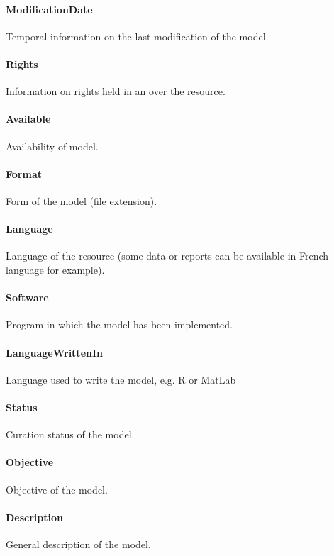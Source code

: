 \documentclass[a4paper]{report}
\begin{document}
\paragraph{ModificationDate}
Temporal information on the last modification of the model.

\paragraph{Rights}
Information on rights held in an over the resource.

\paragraph{Available}
Availability of model.

\paragraph{Format}
Form of the model (file extension).

\paragraph{Language}
Language of the resource (some data or reports can be available in French language for example).

\paragraph{Software}
Program in which the model has been implemented.

\paragraph{LanguageWrittenIn}
Language used to write the model, e.g. R or MatLab

\paragraph{Status}
Curation status of the model.

\paragraph{Objective}
Objective of the model.

\paragraph{Description}
General description of the model.
\end{document}
